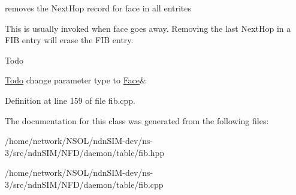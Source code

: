 removes the Next\+Hop record for face in all entrites 

This is usually invoked when face goes away. Removing the last Next\+Hop in a F\+IB entry will erase the F\+IB entry.

\begin{DoxyRefDesc}{Todo}
\item[\hyperlink{todo__todo000026}{Todo}]change parameter type to \hyperlink{classnfd_1_1Face}{Face}\& \end{DoxyRefDesc}


Definition at line 159 of file fib.\+cpp.



The documentation for this class was generated from the following files\+:\begin{DoxyCompactItemize}
\item 
/home/network/\+N\+S\+O\+L/ndn\+S\+I\+M-\/dev/ns-\/3/src/ndn\+S\+I\+M/\+N\+F\+D/daemon/table/fib.\+hpp\item 
/home/network/\+N\+S\+O\+L/ndn\+S\+I\+M-\/dev/ns-\/3/src/ndn\+S\+I\+M/\+N\+F\+D/daemon/table/fib.\+cpp\end{DoxyCompactItemize}

